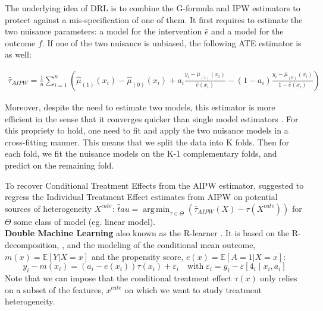 \documentclass[10pt,letterpaper]{article}
\DeclareMathOperator*{\argmin}{arg\,min}
\begin{document}
The underlying idea of DRL is to combine the G-formula and IPW estimators to
protect against a mis-specification of one of them. It first requires to
estimate the two nuisance parameters: a model for the intervention $\hat{e}$
and a model for the outcome $f$. If one of the two nuisance is unbiased, the
following ATE estimator is as well:

$$\begin{aligned} \widehat{\tau}_{A I P W}=\frac{1}{n}
    \sum_{i=1}^{n}\left(\hat \mu_{(1)}\left(x_{i}\right)-\hat \mu_{(0)}\left(x_{i}\right)+a_{i}
    \frac{y_{i}-\hat \mu_{(1)}\left(x_{i}\right)}{\hat{e}\left(x_{i}\right)}-\left(1-a_{i}\right)
    \frac{y_{i}-\hat \mu_{(0)}\left(x_{i}\right)}{1-\hat{e}\left(x_{i}\right)}\right)
  \end{aligned}$$

Moreover, despite the need to estimate two models, this estimator is more
efficient in the sense that it converges quicker than single model estimators
\cite{wager2020stats}. For this propriety to hold, one need to fit and apply
the two nuisance models in a cross-fitting manner. This means that we split
the data into K folds. Then for each fold, we fit the nuisance models on the
K-1 complementary folds, and predict on the remaining fold.

To recover Conditional Treatment Effects from the AIPW estimator,
\cite{foster2019orthogonal} suggested to regress the Individual Treatment
Effect estimates from AIPW on potential sources of heterogeneity $X^{cate}$:
$\hat tau = \argmin_{\tau \in \Theta} (\hat \tau_{AIPW}(X) - \tau(X^{cate}))$
for $\Theta$ some class of model (eg. linear model).\\

\textbf{Double Machine Learning} \cite{chernozhukov2018double} also known
as the R-learner \cite{nie2021quasi}. It is based on the R-decomposition,
\cite{robinson1988root}, and the modeling of the conditional mean outcome,
$m(x)=\mathbb E[Y|X=x]$ and the propensity score, $e(x)=\mathbb E[A=1|X=x]$:
\begin{equation}\label{eq:r_decomposition}
  y_{i}-m\left(x_{i}\right)=\left(a_{i}-e\left(x_{i}\right)\right) \tau\left(x_{i}\right)+\varepsilon_{i} \quad \text{with} \; \varepsilon_{i}=y_{i}-\varepsilon\left[4_{i} \mid x_{i}, a_{i}\right]
\end{equation}
Note that we can impose that the conditional treatment effect $\tau(x)$ only
relies on a subset of the features, $x^{cate}$ on which we want to study
treatment heterogeneity.
\end{document}
